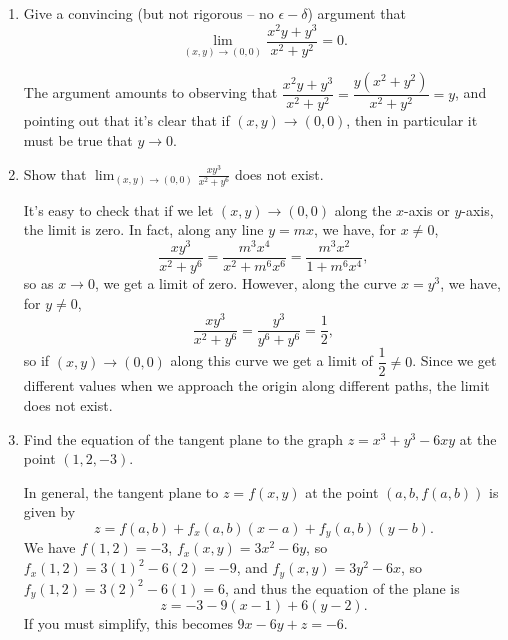 \documentclass[letterpaper,12pt]{article}
\begin{document}
\begin{enumerate}
\bigskip


 \item Give a convincing (but not rigorous -- no $\epsilon - \delta$) argument that
\[
 \lim_{(x,y)\to (0,0)}\frac{x^2y+y^3}{x^2+y^2} = 0.
\]

\bigskip

The argument amounts to observing that $\dfrac{x^2y+y^3}{x^2+y^2} = \dfrac{y(x^2+y^2)}{x^2+y^2} = y$, and pointing out that it's clear that if $(x,y)\to (0,0)$, then in particular it must be true that $y\to 0$.

\bigskip

 \item Show that $\displaystyle \lim_{(x,y)\to (0,0)}\frac{xy^3}{x^2+y^6}$ does not exist.

\bigskip

It's easy to check that if we let $(x,y)\to (0,0)$ along the $x$-axis or $y$-axis, the limit is zero. In fact, along any line $y=mx$, we have, for $x\neq 0$,
\[
 \frac{xy^3}{x^2+y^6} = \frac{m^3x^4}{x^2+m^6x^6} = \frac{m^3x^2}{1+m^6x^4},
\]
so as $x\to 0$, we get a limit of zero. However, along the curve $x=y^3$, we have, for $y\neq 0$,
\[
 \frac{xy^3}{x^2+y^6} = \frac{y^3}{y^6+y^6} = \frac{1}{2},
\]
so if $(x,y)\to (0,0)$ along this curve we get a limit of $\dfrac{1}{2}\neq 0$. Since we get different values when we approach the origin along different paths, the limit does not exist.

\bigskip


\item Find the equation of the tangent plane to the graph $z=x^3+y^3-6xy$ at the point $(1,2,-3)$.

\bigskip

In general, the tangent plane to $z=f(x,y)$ at the point $(a,b,f(a,b))$ is given by
\[
 z = f(a,b) + f_x(a,b)(x-a)+f_y(a,b)(y-b).
\]
We have $f(1,2)=-3$, $f_x(x,y) = 3x^2-6y$, so $f_x(1,2) = 3(1)^2-6(2) = -9$, and $f_y(x,y) = 3y^2-6x$, so $f_y(1,2) = 3(2)^2-6(1) = 6$, and thus the equation of the plane is
\[
 z = -3 -9(x-1) + 6(y-2).
\]
If you must simplify, this becomes $9x-6y+z=-6$.



 
\end{enumerate}
\end{document}
